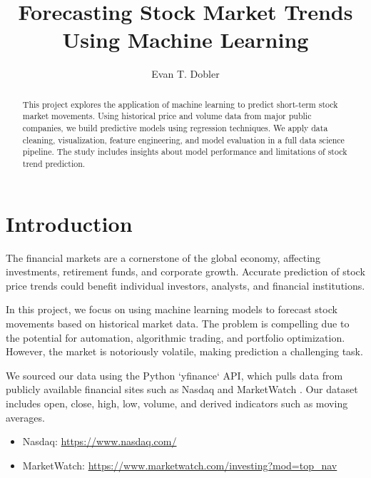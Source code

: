 \documentclass[runningheads]{llncs}
\begin{document}
\title{Forecasting Stock Market Trends Using Machine Learning}

\author{Evan T. Dobler}



\maketitle

\begin{abstract}
This project explores the application of machine learning to predict short-term stock market movements. Using historical price and volume data from major public companies, we build predictive models using regression techniques. We apply data cleaning, visualization, feature engineering, and model evaluation in a full data science pipeline. The study includes insights about model performance and limitations of stock trend prediction.
\end{abstract}

\section{Introduction}
The financial markets are a cornerstone of the global economy, affecting investments, retirement funds, and corporate growth. Accurate prediction of stock price trends could benefit individual investors, analysts, and financial institutions. 

In this project, we focus on using machine learning models to forecast stock movements based on historical market data. The problem is compelling due to the potential for automation, algorithmic trading, and portfolio optimization. However, the market is notoriously volatile, making prediction a challenging task. 

We sourced our data using the Python `yfinance` API, which pulls data from publicly available financial sites such as Nasdaq \cite{nasdaq} and MarketWatch \cite{marketwatch}. Our dataset includes open, close, high, low, volume, and derived indicators such as moving averages.

\begin{itemize}
    \item Nasdaq: \url{https://www.nasdaq.com/}
    \item MarketWatch: \url{https://www.marketwatch.com/investing?mod=top_nav}
\end{itemize}
\end{document}
